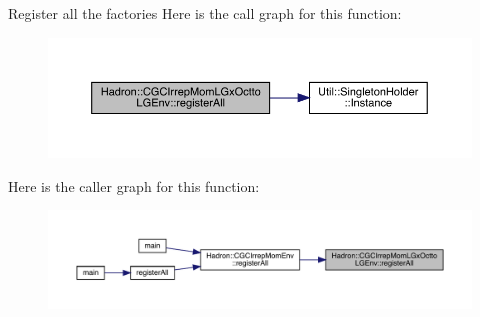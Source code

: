 Register all the factories Here is the call graph for this function\+:\nopagebreak
\begin{figure}[H]
\begin{center}
\leavevmode
\includegraphics[width=350pt]{d8/d3a/namespaceHadron_1_1CGCIrrepMomLGxOcttoLGEnv_a8e2a60d80852181dcdfbcef290164852_cgraph}
\end{center}
\end{figure}
Here is the caller graph for this function\+:
\nopagebreak
\begin{figure}[H]
\begin{center}
\leavevmode
\includegraphics[width=350pt]{d8/d3a/namespaceHadron_1_1CGCIrrepMomLGxOcttoLGEnv_a8e2a60d80852181dcdfbcef290164852_icgraph}
\end{center}
\end{figure}
